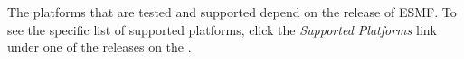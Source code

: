 

The platforms that are tested and supported depend on the release
of ESMF.  To see the specific list of supported platforms,
click the {\em Supported Platforms} link under one of the releases
on the .


\vspace{1ex}

